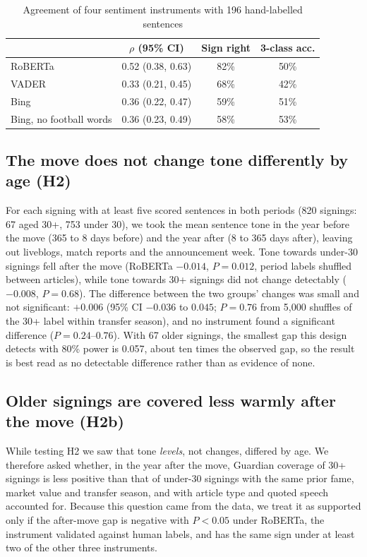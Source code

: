 \documentclass[9pt,twocolumn,twoside]{pnas-new}
\begin{document}
\begin{table}[tbhp]
\centering
\caption{Agreement of four sentiment instruments with 196 hand-labelled sentences}
\begin{tabular}{lccc}
 & $\rho$ (95\% CI) & Sign right & 3-class acc. \\
\midrule
RoBERTa & 0.52 (0.38, 0.63) & 82\% & 50\% \\
VADER & 0.33 (0.21, 0.45) & 68\% & 42\% \\
Bing & 0.36 (0.22, 0.47) & 59\% & 51\% \\
Bing, no football words & 0.36 (0.23, 0.49) & 58\% & 53\% \\
\bottomrule
\end{tabular}
\label{tab:validation}
\end{table}

\subsection*{The move does not change tone differently by age (H2)}
For each signing with at least five scored sentences in both periods (820 signings: 67 aged 30+, 753 under 30), we took the mean sentence tone in the year before the move (365 to 8 days before) and the year after (8 to 365 days after), leaving out liveblogs, match reports and the announcement week. Tone towards under-30 signings fell after the move (RoBERTa $-0.014$, $P=0.012$, period labels shuffled between articles), while tone towards 30+ signings did not change detectably ($-0.008$, $P=0.68$). The difference between the two groups' changes was small and not significant: $+0.006$ (95\% CI $-0.036$ to $0.045$; $P=0.76$ from 5,000 shuffles of the 30+ label within transfer season), and no instrument found a significant difference ($P=0.24$--$0.76$). With 67 older signings, the smallest gap this design detects with 80\% power is 0.057, about ten times the observed gap, so the result is best read as no detectable difference rather than as evidence of none.

\subsection*{Older signings are covered less warmly after the move (H2b)}
While testing H2 we saw that tone \emph{levels}, not changes, differed by age. We therefore asked whether, in the year after the move, Guardian coverage of 30+ signings is less positive than that of under-30 signings with the same prior fame, market value and transfer season, and with article type and quoted speech accounted for. Because this question came from the data, we treat it as supported only if the after-move gap is negative with $P<0.05$ under RoBERTa, the instrument validated against human labels, and has the same sign under at least two of the other three instruments.
\end{document}
